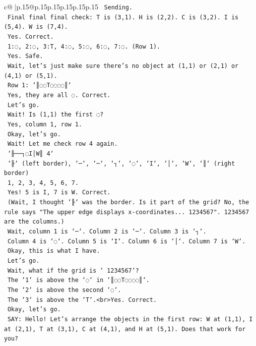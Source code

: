 \documentclass{article}
\begin{document}
{\begin{supertabular}{c@{$\;$}|p{.15\linewidth}@{}p{.15\linewidth}p{.15\linewidth}p{.15\linewidth}p{.15\linewidth}p{.15\linewidth}}
{{{\texttt{    Sending.} \\
\texttt{    Final final final check: T is (3,1). H is (2,2). C is (3,2). I is (5,4). W is (7,4).} \\
\texttt{    Yes. Correct.} \\
\texttt{    1:◌, 2:◌, 3:T, 4:◌, 5:◌, 6:◌, 7:◌. (Row 1).} \\
\texttt{    Yes. Safe.} \\
\texttt{    Wait, let's just make sure there's no object at (1,1) or (2,1) or (4,1) or (5,1).} \\
\texttt{    Row 1: `║◌◌T◌◌◌◌║`} \\
\texttt{    Yes, they are all ◌. Correct.} \\
\texttt{    Let's go.} \\
\texttt{    Wait! Is (1,1) the first ◌?} \\
\texttt{    Yes, column 1, row 1.} \\
\texttt{    Okay, let's go.} \\
\texttt{    Wait! Let me check row 4 again.} \\
\texttt{    `╟──┐◌I│W║ 4`} \\
\texttt{    `╟` (left border), `─`, `─`, `┐`, `◌`, `I`, `│`, `W`, `║` (right border)} \\
\texttt{    1, 2, 3, 4, 5, 6, 7.} \\
\texttt{    Yes! 5 is I, 7 is W. Correct.} \\
\texttt{    (Wait, I thought `╟` was the border. Is it part of the grid? No, the rule says "The upper edge displays x{-}coordinates... 1234567". 1234567 are the columns.)} \\
\texttt{    Wait, column 1 is `─`. Column 2 is `─`. Column 3 is `┐`.} \\
\texttt{    Column 4 is `◌`. Column 5 is `I`. Column 6 is `│`. Column 7 is `W`.} \\
\texttt{    Okay, this is what I have.} \\
\texttt{    Let's go.} \\
\texttt{    Wait, what if the grid is ` 1234567`?} \\
\texttt{    The `1` is above the `◌` in `║◌◌T◌◌◌◌║`.} \\
\texttt{    The `2` is above the second `◌`.} \\
\texttt{    The `3` is above the `T`.<br>Yes. Correct.} \\
\texttt{    Okay, let's go.} \\
\texttt{    SAY: Hello! Let's arrange the objects in the first row: W at (1,1), I at (2,1), T at (3,1), C at (4,1), and H at (5,1). Does that work for you?} \\
}}}
\end{supertabular}}
\end{document}
